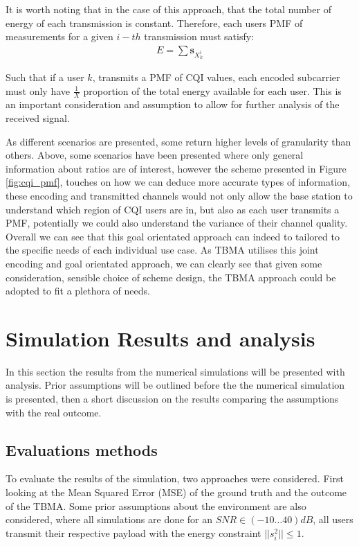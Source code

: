 \documentclass{article}
\begin{document}
It is worth noting that in the case of this approach, that the total number of energy of each transmission is constant. Therefore, each users PMF of measurements for a given $i-th$ transmission must satisfy:
\begin{align}
    E = \sum \boldsymbol{s}_{X^i_k} 
\end{align}

Such that if a user $k$, transmits a PMF of CQI values, each encoded subcarrier must only have $\frac{1}{X}$ proportion of the total energy available for each user. This is an important consideration and assumption to allow for further analysis of the received signal. 


As different scenarios are presented, some return higher levels of granularity than others. Above, some scenarios have been presented where only general information about ratios are of interest, however the scheme presented in Figure \ref{fig:cqi_pmf}, touches on how we can deduce more accurate types of information, these encoding and transmitted channels would not only allow the base station to understand which region of CQI users are in, but also as each user transmits a PMF, potentially we could also understand the variance of their channel quality.  Overall we can see that this goal orientated approach can indeed to tailored to the specific needs of each individual use case. As TBMA utilises this joint encoding and goal orientated approach, we can clearly see that given some consideration, sensible choice of scheme design, the TBMA approach could be adopted to fit a plethora of needs. 


\section{Simulation Results and analysis}\label{sim_results}
In this section the results from the numerical simulations will be presented with analysis. Prior assumptions will be outlined before the the numerical simulation is presented, then a short discussion on the results comparing the assumptions with the real outcome. 
\subsection{Evaluations methods}
To evaluate the results of the simulation, two approaches were considered. First looking at the Mean Squared Error (MSE) of the ground truth and the outcome of the TBMA.  Some prior assumptions about the environment are also considered, where all simulations are done for an $SNR \in (-10\dots40)dB$, all users transmit their respective payload with the energy constraint  $||s_{i}^2|| \leq 1$.  
\end{document}
